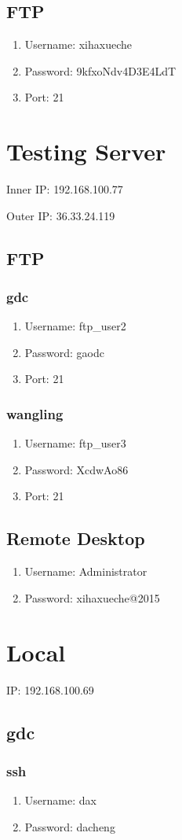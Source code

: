 \documentclass[UTF8, a4paper, titlepage]{ctexart}
\begin{document}
\subsection{FTP}
\begin{enumerate}
    \item Username: xihaxueche
    \item Password: 9kfxoNdv4D3E4LdT
    \item Port: 21
\end{enumerate}


\newpage
\section{Testing Server}
Inner IP: 192.168.100.77

Outer IP: 36.33.24.119
\subsection{FTP}
\subsubsection{gdc}
\begin{enumerate}
    \item Username: ftp\_user2
    \item Password: gaodc
    \item Port: 21
\end{enumerate}
\subsubsection{wangling}
\begin{enumerate}
    \item Username: ftp\_user3
    \item Password: XcdwAo86
    \item Port: 21
\end{enumerate}

\subsection{Remote Desktop}
\begin{enumerate}
    \item Username: Administrator
    \item Password: xihaxueche@2015
\end{enumerate}

\newpage
\section{Local}
IP: 192.168.100.69

\subsection{gdc}
\subsubsection{ssh}
\begin{enumerate}
    \item Username: dax
    \item Password: dacheng
\end{enumerate}
\end{document}
